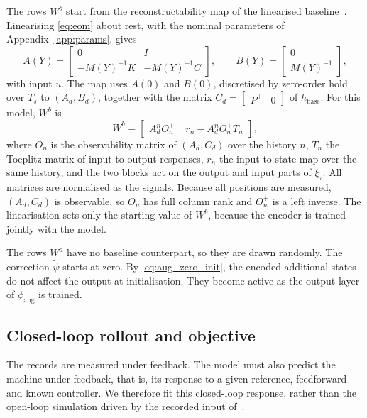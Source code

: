 The rows $W^b$ start from the reconstructability map of the linearised
baseline~\cite[Sec.~3.1]{hoekstra2026encoder}.
Linearising \eqref{eq:eom} about rest, with the nominal parameters of
Appendix~\ref{app:params}, gives
\begin{equation}
 A(Y)=\begin{bmatrix}0 & I\\ -M(Y)^{-1}K & -M(Y)^{-1}C\end{bmatrix},\qquad
 B(Y)=\begin{bmatrix}0\\ M(Y)^{-1}\end{bmatrix},
 \label{eq:aug_lin}
\end{equation}
with input $u$.
The map uses $A(0)$ and $B(0)$, discretised by zero-order hold over $T_s$ to
$(A_d,B_d)$, together with the matrix
$C_d=\begin{bmatrix}P^\top & 0\end{bmatrix}$ of $h_{\mathrm{base}}$.
For this model, $W^b$ is~\cite[Eqs.~(16), (17)]{hoekstra2026encoder}
\begin{equation}
 W^b=\begin{bmatrix}
  A_d^nO_n^{+} & \;r_n-A_d^nO_n^{+}T_n
 \end{bmatrix},
 \label{eq:aug_wb}
\end{equation}
where $O_n$ is the observability matrix of $(A_d,C_d)$ over the history $n$,
$T_n$ the Toeplitz matrix of input-to-output responses, $r_n$ the
input-to-state map over the same history, and the two blocks act on the
output and input parts of $\xi_\tau$.
All matrices are normalised as the signals.
Because all positions are measured, $(A_d,C_d)$ is observable, so $O_n$ has
full column rank and $O_n^{+}$ is a left inverse.
The linearisation sets only the starting value of $W^b$, because the encoder
is trained jointly with the model.

The rows $W^a$ have no baseline counterpart, so they are drawn randomly.
The correction $\tilde\psi$ starts at zero.
By \eqref{eq:aug_zero_init}, the encoded additional states do not affect the
output at initialisation.
They become active as the output layer of $\phi_{\mathrm{aug}}$ is trained.

\subsection{Closed-loop rollout and objective}\label{sec:aug_closed_loop}
The records are measured under feedback.
The model must also predict the machine under feedback, that is, its
response to a given reference, feedforward and known controller.
We therefore fit this closed-loop response, rather than the open-loop
simulation driven by the recorded input of~\cite[Eq.~(22)]{hoekstra2026lfr}.

